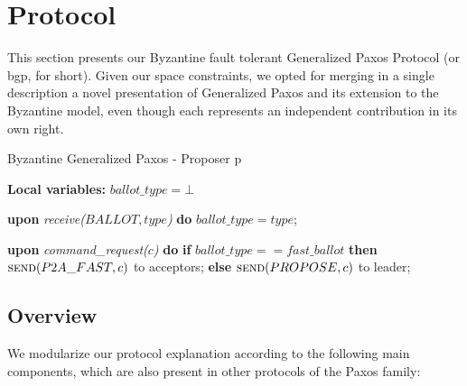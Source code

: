 \section{Protocol}

This section presents our Byzantine fault tolerant Generalized Paxos
Protocol (or \acrshort{bgp}, for short). Given our space constraints, we opted
for merging in a single description a novel presentation of
Generalized Paxos and its extension to the Byzantine model, even though
each represents an independent contribution in its own right.


\begin{algorithm}
	\caption{Byzantine Generalized Paxos - Proposer p}
	\label{BFT-Prop}
	\textbf{Local variables:} $ballot\_type = \bot$
	\begin{algorithmic}[1]	
		
		\State \textbf{upon} \textit{receive($BALLOT, type$)} \textbf{do} 
		\State \hspace{\algorithmicindent} $ballot\_type = type$;
		\State
		
		\State \textbf{upon} \textit{command\_request($c$)} \textbf{do}   \hspace{\algorithmicindent}\hspace{\algorithmicindent}\hspace{\algorithmicindent}\hspace{\algorithmicindent}
		\State \hspace{\algorithmicindent} \textbf{if} $ballot\_type == fast\_ballot$ \textbf{then}
		\State \hspace{\algorithmicindent}\hspace{\algorithmicindent} $\Call{send}{P2A\_FAST, c}$ to acceptors;
		\State \hspace{\algorithmicindent} \textbf{else} 
		\State \hspace{\algorithmicindent}\hspace{\algorithmicindent} $\Call{send}{PROPOSE, c}$ to leader;		
	\end{algorithmic}
\end{algorithm}

\subsection{Overview}
We modularize our protocol explanation according to the following main components, which are also present in other protocols of the Paxos family:

